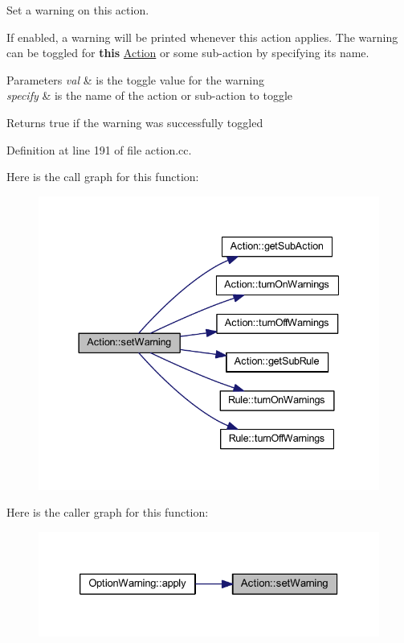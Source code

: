 Set a warning on this action. 

If enabled, a warning will be printed whenever this action applies. The warning can be toggled for {\bfseries{this}} \mbox{\hyperlink{class_action}{Action}} or some sub-\/action by specifying its name. 
\begin{DoxyParams}{Parameters}
{\em val} & is the toggle value for the warning \\
\hline
{\em specify} & is the name of the action or sub-\/action to toggle \\
\hline
\end{DoxyParams}
\begin{DoxyReturn}{Returns}
true if the warning was successfully toggled 
\end{DoxyReturn}


Definition at line 191 of file action.\+cc.

Here is the call graph for this function\+:
\nopagebreak
\begin{figure}[H]
\begin{center}
\leavevmode
\includegraphics[width=337pt]{class_action_ad9b48eafb7c921a0365e78561aca3f13_cgraph}
\end{center}
\end{figure}
Here is the caller graph for this function\+:
\nopagebreak
\begin{figure}[H]
\begin{center}
\leavevmode
\includegraphics[width=326pt]{class_action_ad9b48eafb7c921a0365e78561aca3f13_icgraph}
\end{center}
\end{figure}
\mbox{\label{class_action_a7ee7521e4259621cc001ea272ace4778}} 

